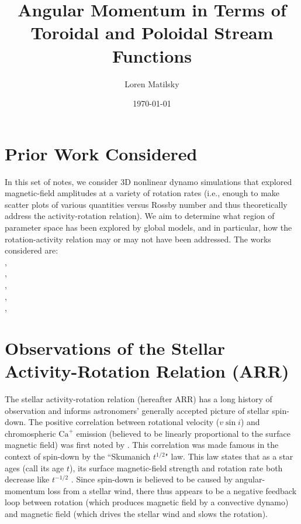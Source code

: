 \documentclass[12pt]{article} %
\date{\today}
\author{Loren Matilsky}
\title{Angular Momentum in Terms of Toroidal and Poloidal Stream Functions}
\begin{document}
	\maketitle

\section{Prior Work Considered}
In this set of notes, we consider 3D nonlinear dynamo simulations that explored magnetic-field amplitudes at a variety of rotation rates (i.e., enough to make scatter plots of various quantities versus Rossby number and thus theoretically address the activity-rotation relation). We aim to determine what region of parameter space has been explored by global models, and in particular, how the rotation-activity relation may or may not have been addressed. The works considered are:\\

\citet{Christensen2006},\\

\citet{Christensen2009},\\

\citet{Strugarek2017},\\

\citet{Guerrero2019},\\

\citet{Brun2022},\\

\section{Observations of the Stellar Activity-Rotation Relation (ARR)}
The stellar activity-rotation relation (hereafter ARR) has a long history of observation and informs astronomers' generally accepted picture of stellar spin-down. The positive correlation between rotational velocity ($v\sin i$) and chromospheric $\text{Ca}^+$ emission (believed to be linearly proportional to the surface magnetic field) was first noted by \citet{Kraft1967}. This correlation was made famous in the context of spin-down by the ``Skumanich $t^{1/2}$" law. This law states that as a star ages (call its age $t$), its surface magnetic-field strength and rotation rate both decrease like $t^{-1/2}$ \citep{Skumanich1972}. Since spin-down is believed to be caused by angular-momentum loss from a stellar wind, there thus appears to be a negative feedback loop between rotation (which produces magnetic field by a convective dynamo) and magnetic field (which drives the stellar wind and slows the rotation). 
\end{document}
